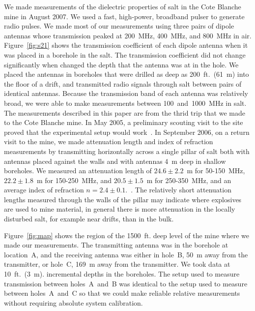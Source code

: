 \documentclass{article}
\begin{document}
  We made measurements of the dielectric properties of salt in the Cote Blanche mine 
  in August 2007.  We used a fast, high-power, broadband pulser 
  to generate radio pulses.  We made most of our measurements using three pairs 
  of dipole antennas whose transmission peaked at 200~MHz, 400~MHz, and 800~MHz in air.  
  Figure~\ref{fig:s21} shows the transmission coefficient of each dipole antenna when it was 
  placed in a borehole in the salt.  The 
  transmission coefficient did not change significantly when changed the depth that the antenna 
  was at in the hole.  
  We placed the antennas in boreholes that were drilled as deep as 200~ft.~(61~m) into the floor 
  of a drift, and transmitted radio signals through salt between pairs of identical antennas.
  Because the transmission band of each antenna was relatively broad, we were able to make 
  measurements between 100~and~1000~MHz in salt. 
  The measurements described in this paper are from the thrid trip that we made to the Cote 
  Blanche mine.  In May 2005, a preliminary 
  scouting visit to the site proved that the experimental setup would work~\cite{firstvisit}.  
  In September 2006, on a return visit to the mine, we made attenuation length 
  and index of refraction measurements by transmitting horizontally across a 
  single pillar of salt both with antennas placed against the walls 
  and with antennas 4~m deep in shallow boreholes.  We measured an attenuation length 
  of $24.6\pm2.2$~m for 50-150~MHz, $22.2\pm1.8$~m for 150-250~MHz, and $20.5\pm1.5$~m 
  for 250-350~MHz, and an average index of refraction $n=2.4\pm0.1$.~\cite{secondvisit}.  
  The relatively short attenuation lengths measured through the walls of the pillar 
  may indicate where explosives are used to mine material, in general 
  there is more attenuation in the locally disturbed salt, for example near drifts, 
  than in the bulk.
  
  Figure~\ref{fig:map} shows the region of the 1500~ft. deep level of the mine 
  where we made our measurements.  The transmitting antenna was in the borehole at 
  location~A, and the receiving antenna was either in hole~B, 50~m away from the 
  transmitter, or hole~C, 169~m away from the transmitter.  We took data at 10~ft.~(3~m). 
  incremental depths in the boreholes.  The setup used to measure transmission between 
  holes~A~and~B was identical to the setup used to measure between holes~A~and~C 
  so that we could make reliable relative measurements without requiring absolute system 
  calibration.
  
\end{document}
